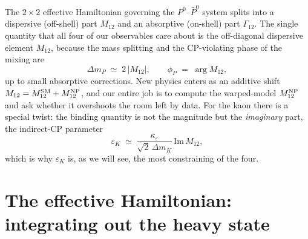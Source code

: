 \documentclass[11pt]{article}
\newcommand{\eps}{\varepsilon}
\newcommand{\Mtwelve}{M_{12}}
\newcommand{\ImMtwelve}{\mathrm{Im}\,M_{12}}
\theoremstyle{definition}
\begin{document}
The $2\times2$ effective Hamiltonian governing the $P^0$--$\bar P^0$ system splits
into a dispersive (off-shell) part $\Mtwelve$ and an absorptive (on-shell) part
$\Gamma_{12}$. The single quantity that all four of our observables care about is
the off-diagonal dispersive element $\Mtwelve$, because the mass splitting and the
CP-violating phase of the mixing are
\begin{equation}
\Delta m_P \;\simeq\; 2\,|\Mtwelve|, \qquad
\phi_P \;=\; \arg\Mtwelve ,
\label{eq:dmphi}
\end{equation}
up to small absorptive corrections. New physics enters as an additive shift
$\Mtwelve = \Mtwelve^{\rm SM} + \Mtwelve^{\rm NP}$, and our entire job is to
compute the warped-model $\Mtwelve^{\rm NP}$ and ask whether it overshoots the
room left by data. For the kaon there is a special twist: the binding quantity is
not the magnitude but the \emph{imaginary} part, the indirect-CP parameter
\begin{equation}
\eps_K \;\simeq\; \frac{\kappa_\eps}{\sqrt2\,\Delta m_K}\,\ImMtwelve ,
\label{eq:epsk}
\end{equation}
which is why $\eps_K$ is, as we will see, the most constraining of the four.

\section{The effective Hamiltonian: integrating out the heavy state}
\label{sec:effham}
\end{document}
